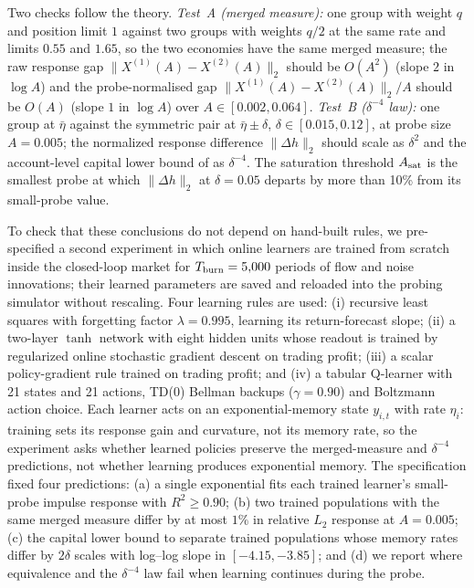 \documentclass[12pt]{article}
\theoremstyle{definition}
\theoremstyle{remark}
\begin{document}
Two checks follow the theory. \emph{Test~A (merged measure):} one group with weight $q$ and position limit $1$ against two groups with weights $q/2$ at the same rate and limits $0.55$ and $1.65$, so the two economies have the same merged measure; the raw response gap $\|X^{(1)}(A)-X^{(2)}(A)\|_2$ should be $O(A^2)$ (slope $2$ in $\log A$) and the probe-normalised gap $\|X^{(1)}(A)-X^{(2)}(A)\|_2/A$ should be $O(A)$ (slope $1$ in $\log A$) over $A\in[0.002,0.064]$. \emph{Test~B ($\delta^{-4}$ law):} one group at $\bar\eta$ against the symmetric pair at $\bar\eta\pm\delta$, $\delta\in[0.015,0.12]$, at probe size $A=0.005$; the normalized response difference $\|\Delta h\|_2$ should scale as $\delta^2$ and the account-level capital lower bound of \citet{niroula2026a} as $\delta^{-4}$. The saturation threshold $A_{\rm sat}$ is the smallest probe at which $\|\Delta h\|_2$ at $\delta=0.05$ departs by more than 10\% from its small-probe value.

To check that these conclusions do not depend on hand-built rules, we pre-specified a second experiment in which online learners are trained from scratch inside the closed-loop market for $T_{\rm burn}=5{,}000$ periods of flow and noise innovations; their learned parameters are saved and reloaded into the probing simulator without rescaling. Four learning rules are used: (i) recursive least squares with forgetting factor $\lambda=0.995$, learning its return-forecast slope; (ii) a two-layer $\tanh$ network with eight hidden units whose readout is trained by regularized online stochastic gradient descent on trading profit; (iii) a scalar policy-gradient rule trained on trading profit; and (iv) a tabular Q-learner with 21 states and 21 actions, TD(0) Bellman backups ($\gamma=0.90$) and Boltzmann action choice. Each learner acts on an exponential-memory state $y_{i,t}$ with rate $\eta_i$: training sets its response gain and curvature, not its memory rate, so the experiment asks whether learned policies preserve the merged-measure and $\delta^{-4}$ predictions, not whether learning produces exponential memory. The specification fixed four predictions: (a) a single exponential fits each trained learner's small-probe impulse response with $R^2\ge0.90$; (b) two trained populations with the same merged measure differ by at most $1\%$ in relative $L_2$ response at $A=0.005$; (c) the capital lower bound to separate trained populations whose memory rates differ by $2\delta$ scales with log--log slope in $[-4.15,-3.85]$; and (d) we report where equivalence and the $\delta^{-4}$ law fail when learning continues during the probe.
\end{document}
